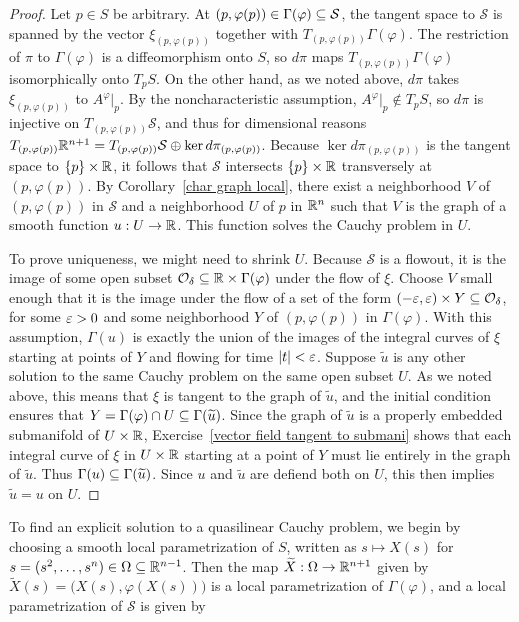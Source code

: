 \begin{proof}
Let $p\in S$ be arbitrary. At $(p,\varphi(p))\in\Gamma(\varphi)\subseteq\mathcal{S}$, the tangent space to $\mathcal{S}$ is spanned by the vector $\xi_{(p,\varphi(p))}$ together with $T_{(p,\varphi(p))}\Gamma(\varphi)$. The restriction of $\pi$ to $\Gamma(\varphi)$ is a diffeomorphism onto $S$, so $d\pi$ maps $T_{(p,\varphi(p))}\Gamma(\varphi)$ isomorphically onto $T_pS$. On the other hand, as we noted above, $d\pi$ takes $\xi_{(p,\varphi(p))}$ to $A^\varphi|_p$. By the noncharacteristic assumption, $A^\varphi|_p\notin T_pS$, so $d\pi$ is injective on $T_{(p,\varphi(p))}\mathcal{S}$, and thus for dimensional reasons $T_{(p,\varphi(p))}\mathbb{R}^{n+1}=T_{(p,\varphi(p))}\mathcal{S}\oplus\ker d\pi_{(p,\varphi(p))}$. Because $\ker d\pi_{(p,\varphi(p))}$ is the tangent space to $\{p\}\times\mathbb{R}$, it follows that $\mathcal{S}$ intersects $\{p\}\times\mathbb{R}$ transversely at $(p,\varphi(p))$. By Corollary~\ref{char graph local}, there exist a neighborhood $V$ of $(p,\varphi(p))$ in $\mathcal{S}$ and a neighborhood $U$ of $p$ in $\mathbb{R}^n$ such that $V$ is the graph of a smooth function $u:U\to\mathbb{R}$. This function solves the Cauchy problem in $U$.\par
To prove uniqueness, we might need to shrink $U$. Because $\mathcal{S}$ is a flowout, it is the image of some open subset $\mathcal{O}_\delta\subseteq\mathbb{R}\times\Gamma(\varphi)$ under the flow of $\xi$. Choose $V$ small enough that it is the image under the flow of a set of the form $(-\varepsilon,\varepsilon)\times Y\subseteq\mathcal{O}_\delta$, for some $\varepsilon>0$ and some neighborhood $Y$ of $(p,\varphi(p))$ in $\Gamma(\varphi)$. With this assumption, $\Gamma(u)$ is exactly the union of the images of the integral curves of $\xi$ starting at points of $Y$ and flowing for time $|t|<\varepsilon$. Suppose $\widetilde{u}$ is any other solution to the same Cauchy problem on the same open subset $U$. As we noted above, this means that $\xi$ is tangent to the graph of $\widetilde{u}$, and the initial condition ensures that $Y=\Gamma(\varphi)\cap U\subseteq\Gamma(\widetilde{u})$. Since the graph of $\widetilde{u}$ is a properly embedded submanifold of $U\times\mathbb{R}$, Exercise~\ref{vector field tangent to submani} shows that each integral curve of $\xi$ in $U\times\mathbb{R}$ starting at a point of $Y$ must lie entirely in the graph of $\widetilde{u}$. Thus $\Gamma(u)\subseteq\Gamma(\widetilde{u})$. Since $u$ and $\widetilde{u}$ are defiend both on $U$, this then implies $\widetilde{u}=u$ on $U$.
\end{proof}
To find an explicit solution to a quasilinear Cauchy problem, we begin by choosing a smooth local parametrization of $S$, written as $s\mapsto X(s)$ for $s=(s^2,\dots,s^n)\in\Omega\subseteq\mathbb{R}^{n-1}$. Then the map $\widetilde{X}:\Omega\to\mathbb{R}^{n+1}$ given by $\widetilde{X}(s)=\big(X(s),\varphi(X(s))\big)$ is a local parametrization of $\Gamma(\varphi)$, and a local parametrization of $\mathcal{S}$ is given by
